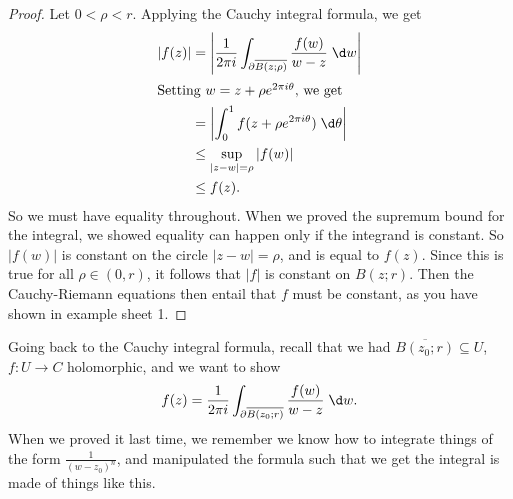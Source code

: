\documentclass[a4paper]{article}
\begin{document}
\begin{proof}
  Let $0 < \rho < r$. Applying the Cauchy integral formula, we get
  \begin{align*}
    |f(z)| &= \left|\frac{1}{2\pi i}\int_{\partial \overline{B(z; \rho)}} \frac{f(w)}{w - z}\;\d w\right|\\
    \intertext{Setting $w = z + \rho e^{2\pi i\theta}$, we get}
    &= \left|\int_0^1 f(z + \rho e^{2 \pi i \theta})\;\d \theta\right|\\
    &\leq \sup_{|z - w| = \rho} |f(w)|\\
    &\leq f(z).
  \end{align*}
  So we must have equality throughout. When we proved the supremum bound for the integral, we showed equality can happen only if the integrand is constant. So $|f(w)|$ is constant on the circle $|z - w| = \rho$, and is equal to $f(z)$. Since this is true for all $\rho \in (0, r)$, it follows that $|f|$ is constant on $B(z; r)$. Then the Cauchy-Riemann equations then entail that $f$ must be constant, as you have shown in example sheet 1.
\end{proof}
Going back to the Cauchy integral formula, recall that we had $\overline{B(z_0; r)} \subseteq U$, $f: U \to C$ holomorphic, and we want to show
\[
  f(z) = \frac{1}{2\pi i} \int_{\partial \overline{B(z_0; r)}} \frac{f(w)}{w - z}\;\d w.
\]
When we proved it last time, we remember we know how to integrate things of the form $\frac{1}{(w - z_0)^n}$, and manipulated the formula such that we get the integral is made of things like this.
\end{document}
